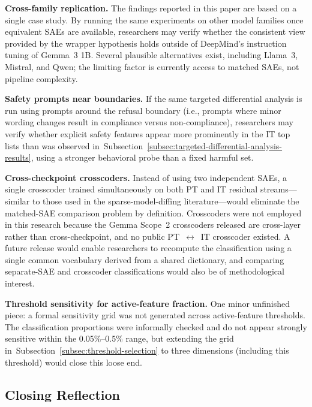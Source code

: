 \textbf{Cross-family replication.} The findings reported in this paper are based on a single case study. By running the same experiments on other model families once equivalent SAEs are available, researchers may verify whether the consistent view provided by the wrapper hypothesis holds outside of DeepMind's instruction tuning of Gemma~3 1B. Several plausible alternatives exist, including Llama~3, Mistral, and Qwen; the limiting factor is currently access to matched SAEs, not pipeline complexity.

\textbf{Safety prompts near boundaries.} If the same targeted differential analysis is run using prompts around the refusal boundary (i.e., prompts where minor wording changes result in compliance versus non-compliance), researchers may verify whether explicit safety features appear more prominently in the IT top lists than was observed in~Subsection~\ref{subsec:targeted-differential-analysis-results}, using a stronger behavioral probe than a fixed harmful set.

\textbf{Cross-checkpoint crosscoders.} Instead of using two independent SAEs, a single crosscoder trained simultaneously on both PT and IT residual streams---similar to those used in the sparse-model-diffing literature---would eliminate the matched-SAE comparison problem by definition. Crosscoders were not employed in this research because the Gemma Scope~2 \parencite{mcdougall_gemma_scope_2_2025} crosscoders released are cross-layer rather than cross-checkpoint, and no public PT~$\leftrightarrow$~IT crosscoder existed. A future release would enable researchers to recompute the classification using a single common vocabulary derived from a shared dictionary, and comparing separate-SAE and crosscoder classifications would also be of methodological interest.

\textbf{Threshold sensitivity for active-feature fraction.} One minor unfinished piece: a formal sensitivity grid was not generated across active-feature thresholds. The classification proportions were informally checked and do not appear strongly sensitive within the 0.05\%--0.5\% range, but extending the grid in~Subsection~\ref{subsec:threshold-selection} to three dimensions (including this threshold) would close this loose end.

\subsection{Closing Reflection}
\label{subsec:closing-reflection}

